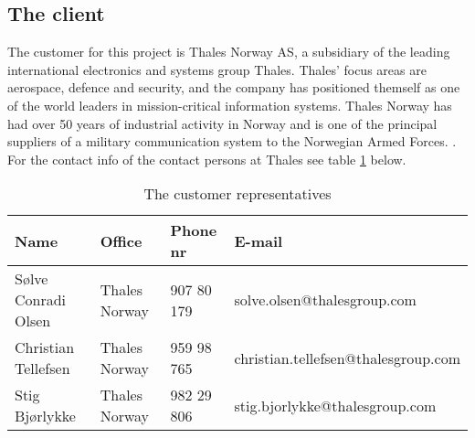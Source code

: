 \subsection{The client}
The customer for this project is Thales Norway AS, a subsidiary of the leading international electronics and systems group Thales. Thales' focus areas are aerospace, defence and security, and the company has positioned themself as one of the world leaders in mission-critical information systems. Thales Norway has had over 50 years of industrial activity in Norway and is one of the principal suppliers of a military communication system to the Norwegian Armed Forces.
\cite{bib:thales}.
\newline
\newline
For the contact info of the contact persons at Thales see table \ref{tab:customer} below.
\begin{table}[h!]
\begin{center}
\begin{tabular}{l|l|l|l}
\hline
\textbf{Name} & \textbf{Office} & \textbf{Phone nr} & \textbf{E-mail} \\ \hline \hline
Sølve Conradi Olsen & Thales Norway & 907 80 179 & solve.olsen@thalesgroup.com \\ 
Christian Tellefsen & Thales Norway & 959 98 765 & christian.tellefsen@thalesgroup.com \\ 
Stig Bjørlykke & Thales Norway & 982 29 806 & stig.bjorlykke@thalesgroup.com \\ \hline
\end{tabular}
\end{center}
\caption{The customer representatives} \label{tab:customer}
\end{table}

